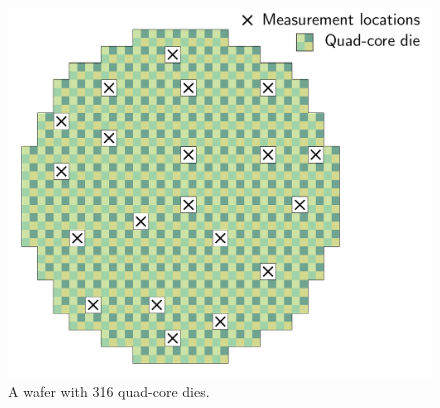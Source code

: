 \begin{figure}
  \centering
  \includegraphics[width=0.7\linewidth]{include/assets/wafer-pick.pdf}
  \caption{A wafer with 316 quad-core dies.}
  \vspace{-1.5em}
\end{figure}
